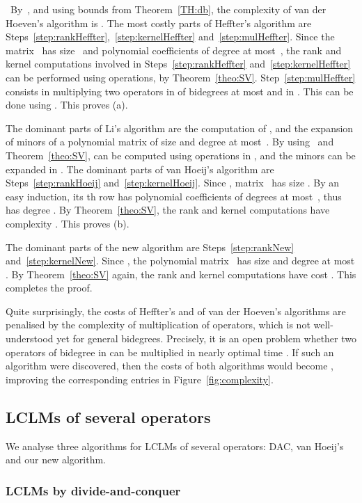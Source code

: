 \documentclass{sig-alt-full}
\def\myproof{\noindent{\sc Proof.}~}
\def\foorp{\hfill}
\begin{document}
\myproof By~\cite[Theorems~5,~8 \& 23]{VdHoeven11}, and using bounds from
Theorem~\ref{TH:db}, the complexity of van der Hoeven's algorithm is
.
The most costly parts of Heffter's algorithm are
Steps~\ref{step:rankHeffter},~\ref{step:kernelHeffter}
and~\ref{step:mulHeffter}. Since the matrix~ has size~ and polynomial coefficients of degree at most~, the rank and kernel computations involved in Steps~\ref{step:rankHeffter} and~\ref{step:kernelHeffter} can be performed using  operations, by Theorem~\ref{theo:SV}. Step~\ref{step:mulHeffter} consists in 
multiplying two operators in  of bidegrees at most  and  in . This can be done using
. This proves (a). 

The dominant parts of Li's algorithm are the computation of , and the expansion of  minors of a polynomial matrix of size  and degree at most~. By using~\cite[Lemma~5.1]{Grigoriev90} and Theorem~\ref{theo:SV},  can be computed using  operations in , and the minors can be expanded in  .
The dominant parts of van Hoeij's algorithm are
Steps~\ref{step:rankHoeij} and~\ref{step:kernelHoeij}.
Since , matrix~ has size . By an easy induction, its th row has polynomial coefficients of degrees at most~, thus  has degree . By Theorem~\ref{theo:SV}, the rank and kernel computations have complexity . This proves (b).

The dominant parts of the new algorithm are
Steps~\ref{step:rankNew} and~\ref{step:kernelNew}. Since , the polynomial matrix~ has size  and degree at most . By Theorem~\ref{theo:SV} again, the rank and kernel computations have cost . This completes the proof.
\foorp

Quite surprisingly, the costs of Heffter's and of van der Hoeven's
algorithms are penalised by the complexity of multiplication of operators,
which is not well-understood yet for general bidegrees. Precisely,
it is an open problem whether two operators of bidegree  in
 can be multiplied in nearly optimal time . If such an algorithm were discovered, then the costs of both
algorithms would become , improving the
corresponding entries in Figure~\ref{fig:complexity}.

\subsection{LCLMs of several operators} \label{ssec:cost-sev} 
We analyse three algorithms for LCLMs of several operators: 
DAC, van Hoeij's and our new algorithm. 

\subsubsection{LCLMs by divide-and-conquer} \label{ssec:iter}
\end{document}
